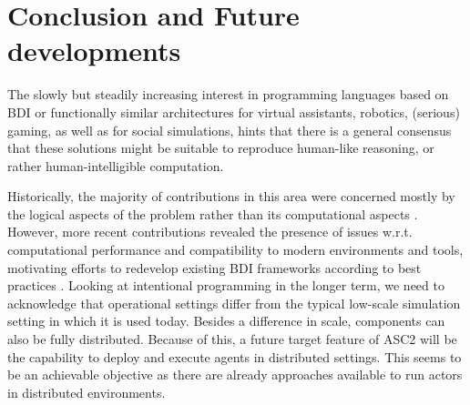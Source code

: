 \section{Conclusion and Future developments}

The slowly but steadily increasing interest in programming languages based on BDI or functionally similar architectures for virtual assistants, robotics, (serious) gaming, as well as for social simulations, hints that there is a general consensus that these solutions might be suitable to reproduce human-like reasoning, or rather human-intelligible computation. 

Historically, the majority of contributions in this area were concerned mostly by the logical aspects of the problem rather than its computational aspects \cite{Herzig2017}. However, more recent contributions %
revealed the presence of issues w.r.t. computational performance and compatibility to modern environments and tools, motivating efforts to redevelop existing BDI frameworks according to best practices \cite{LJ,pyson}. Looking at intentional programming in the longer term, we need to acknowledge that operational settings differ from the typical low-scale simulation setting in which it is used today. Besides a difference in scale, components can also be fully distributed. %
Because of this, a future target feature of ASC2 will be the capability to deploy and execute agents in distributed settings. This seems to be an achievable objective as there are already approaches available to run actors in distributed environments.%

